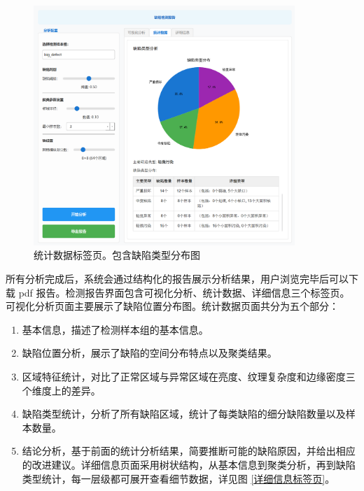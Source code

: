 \documentclass[
  ]{njuthesis}
\begin{document}
\begin{figure}[htb]
    \centering
    \includegraphics[width=0.88\textwidth]{images/统计数据标签页.png}
    \caption{统计数据标签页。包含缺陷类型分布图}
    \label{统计数据标签页}
\end{figure}

所有分析完成后，系统会通过结构化的报告展示分析结果，用户浏览完毕后可以下载 pdf 报告。检测报告界面包含可视化分析、统计数据、详细信息三个标签页。可视化分析页面主要展示了缺陷位置分布图。统计数据页面共分为五个部分：

\begin{enumerate}
    \item 基本信息，描述了检测样本组的基本信息。
    \item 缺陷位置分析，展示了缺陷的空间分布特点以及聚类结果。
    \item 区域特征统计，对比了正常区域与异常区域在亮度、纹理复杂度和边缘密度三个维度上的差异。
    \item 缺陷类型统计，分析了所有缺陷区域，统计了每类缺陷的细分缺陷数量以及样本数量。
    \item 结论分析，基于前面的统计分析结果，简要推断可能的缺陷原因，并给出相应的改进建议。详细信息页面采用树状结构，从基本信息到聚类分析，再到缺陷类型统计，每一层级都可展开查看细节数据，详见图 \ref{详细信息标签页}。
\end{enumerate}
\end{document}
